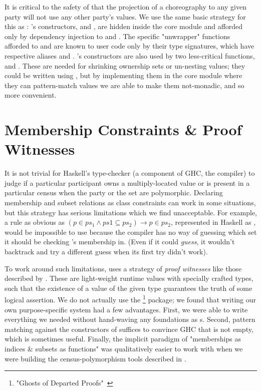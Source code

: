 It is critical to the safety of \MultiChor that the projection of a choreography to any given party will not use
any other party's  values.
We use the same basic strategy for this as \HasChor:
's constructors,  and , are hidden inside the core module
and afforded only by dependency injection to  and .
The specific "unwrapper" functions afforded to  and 
are known to user code only by their type signatures, which have respective aliases  and .
's constructors are also used by two less-critical functions,  and .
These are needed for shrinking ownership sets or un-nesting  values;
they could be written using ,
but by implementing them in the core module where they can pattern-match  values we are able to make them not-monadic,
and so more convenient.


\section{Membership Constraints \& Proof Witnesses}
\label{sec:membership}

It is not trivial for Haskell's type-checker (a component of GHC, the compiler) to judge if
a particular participant owns a multiply-located value or is present in a particular census
when the party or the set are polymorphic.
Declaring membership and subset relations as class constraints can work in some situations,
but this strategy has serious limitations which we find unacceptable.
For example, a rule as obvious as
$(p \in ps_1 \land ps1 \subseteq ps_2) \to p \in ps_2$,
represented in Haskell as
,
would be impossible to use because the compiler has no way of guessing which set 
it should be checking 's membership in.
(Even if it could \emph{guess}, it wouldn't backtrack and try a different guess when its first try didn't work).

To work around such limitations, \MultiChor uses a strategy of \emph{proof witnesses}
like those described by \cite{noonanGDP}.
These are light-weight runtime values with specially crafted types,
such that the existence of a value of the given type guarantees the truth of some logical assertion.
We do not actually use the \footnote{
    "Ghosts of Departed Proofs"~\cite{gdp_hackage}
} package; we found that writing our own purpose-specific system had a few advantages.
First, we were able to write everything we needed without hand-waving any foundations as s.
Second, pattern matching against the constructors of  suffices to convince GHC that  is not empty,
which is sometimes useful.
Finally, the implicit paradigm of "memberships as indices \& subsets as functions" was qualitatively easier to work with
when we were building the census-polymorphism tools described in .

